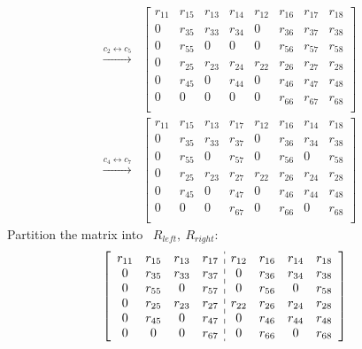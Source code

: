 \documentclass[conference]{IEEEtran}
\numberwithin{equation}{section}
\begin{document}
\begin{align*}
\xrightarrow{c_{2} \leftrightarrow c_{5}}
&\begin{bmatrix}
 r_{11} & r_{15} & r_{13} & r_{14} &  r_{12} & r_{16} & r_{17} & r_{18}\\
 0      & r_{35} & r_{33} & r_{34} &  0      & r_{36} & r_{37} & r_{38}\\
 0      & r_{55} & 0      & 0      &  0      & r_{56} & r_{57} & r_{58}\\
 0      & r_{25} & r_{23} & r_{24} &  r_{22} & r_{26} & r_{27} & r_{28}\\
 0      & r_{45} & 0      & r_{44} &  0      & r_{46} & r_{47} & r_{48}\\
 0      & 0      & 0      & 0      &  0      & r_{66} & r_{67} & r_{68}\\
\end{bmatrix}
\end{align*}
\begin{align*}
\xrightarrow{c_{4} \leftrightarrow c_{7}}
&\begin{bmatrix}
 r_{11} & r_{15} & r_{13} & r_{17} & r_{12} & r_{16} & r_{14} & r_{18}\\
 0      & r_{35} & r_{33} & r_{37} & 0      & r_{36} & r_{34} & r_{38}\\
 0      & r_{55} & 0      & r_{57} & 0      & r_{56} & 0      & r_{58}\\
 0      & r_{25} & r_{23} & r_{27} & r_{22} & r_{26} & r_{24} & r_{28}\\
 0      & r_{45} & 0      & r_{47} & 0      & r_{46} & r_{44} & r_{48}\\
 0      & 0      & 0      & r_{67} & 0      & r_{66} & 0      & r_{68}\\
\end{bmatrix}\end{align*}
Partition the matrix into \ $R_{left}, \ R_{right}$:
 \begin{align*}
&\begin{bmatrix}
\begin{array}{cccc:cccc}
 r_{11} & r_{15} & r_{13} & r_{17} & r_{12} & r_{16} & r_{14} & r_{18}\\
 0      & r_{35} & r_{33} & r_{37} & 0      & r_{36} & r_{34} & r_{38}\\
 0      & r_{55} & 0      & r_{57} & 0      & r_{56} & 0      & r_{58}\\
 0      & r_{25} & r_{23} & r_{27} & r_{22} & r_{26} & r_{24} & r_{28}\\
 0      & r_{45} & 0      & r_{47} & 0      & r_{46} & r_{44} & r_{48}\\
 0      & 0      & 0      & r_{67} & 0      & r_{66} & 0      & r_{68}\\
\end{array}
\end{bmatrix}
\end{align*}
\end{document}
